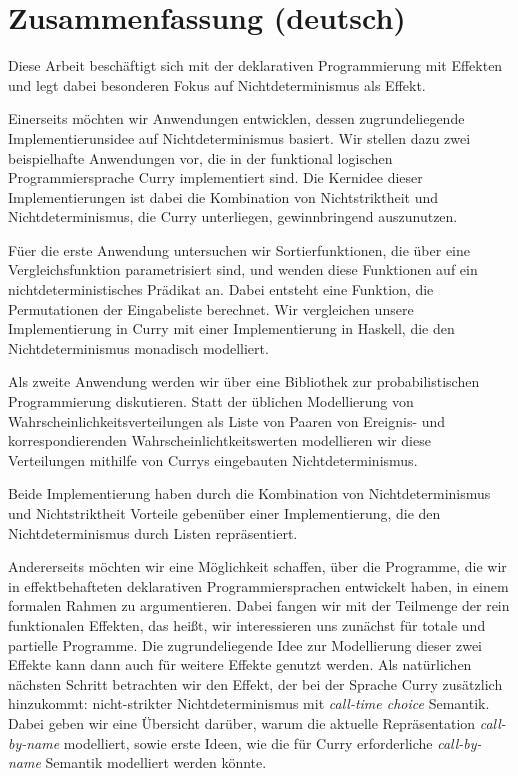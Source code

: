 \chapter*{Zusammenfassung (deutsch)}
\label{sec:abstract-diff}

Diese Arbeit besch\"aftigt sich mit der deklarativen Programmierung mit Effekten und legt dabei besonderen Fokus auf Nichtdeterminismus als Effekt.

Einerseits m\"ochten wir Anwendungen entwicklen, dessen zugrundeliegende Implementierunsidee auf Nichtdeterminismus basiert.
Wir stellen dazu zwei beispielhafte Anwendungen vor, die in der funktional logischen Programmiersprache Curry implementiert sind.
Die Kernidee dieser Implementierungen ist dabei die Kombination von Nichtstriktheit und Nichtdeterminismus, die Curry unterliegen, gewinnbringend auszunutzen.

F\"uer die erste Anwendung untersuchen wir Sortierfunktionen, die \"uber eine Vergleichsfunktion parametrisiert sind, und wenden diese Funktionen auf ein nichtdeterministisches Pr\"adikat an.
Dabei entsteht eine Funktion, die Permutationen der Eingabeliste berechnet.
Wir vergleichen unsere Implementierung in Curry mit einer Implementierung in Haskell, die den Nichtdeterminismus monadisch modelliert.

Als zweite Anwendung werden wir \"uber eine Bibliothek zur probabilistischen Programmierung diskutieren.
Statt der \"ublichen Modellierung von Wahrscheinlichkeitsverteilungen als Liste von Paaren von Ereignis- und korrespondierenden Wahrscheinlichtkeitswerten modellieren wir diese Verteilungen mithilfe von Currys eingebauten Nichtdeterminismus.

Beide Implementierung haben durch die Kombination von Nichtdeterminismus und Nichtstriktheit Vorteile geben\"uber einer Implementierung, die den Nichtdeterminismus durch Listen repr\"asentiert.

Andererseits m\"ochten wir eine M\"oglichkeit schaffen, \"uber die Programme, die wir in effektbehafteten deklarativen Programmiersprachen entwickelt haben, in einem formalen Rahmen zu argumentieren.
Dabei fangen wir mit der Teilmenge der rein funktionalen Effekten, das hei\ss{}t, wir interessieren uns zun\"achst f\"ur totale und partielle Programme.
Die zugrundeliegende Idee zur Modellierung dieser zwei Effekte kann dann auch f\"ur weitere Effekte genutzt werden.
Als nat\"urlichen n\"achsten Schritt betrachten wir den Effekt, der bei der Sprache Curry zus\"atzlich hinzukommt: nicht\--strikter Nichtdeterminismus mit \emph{call\--time choice} Semantik.
Dabei geben wir eine \"Ubersicht dar\"uber, warum die aktuelle Repr\"asentation \emph{call\--by\--name} modelliert, sowie erste Ideen, wie die f\"ur Curry erforderliche \emph{call\--by\--name} Semantik modelliert werden k\"onnte.

\endgroup
